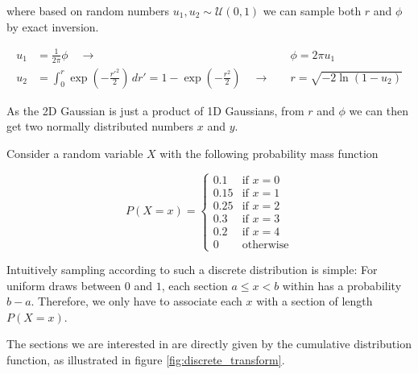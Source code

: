 where based on random numbers $u_1, u_2 \sim \mathcal{U}(0,1)$ we can sample both $r$ and $\phi$ by exact inversion.

\begin{equation}
    \begin{aligned}
        u_1 & = \frac{1}{2\pi} \phi \quad \rightarrow \quad &\phi = 2\pi u_1 \\
        u_2 & = \int_{0}^{r} \exp \left(-\frac{r'^2}{2}\right) \, dr'= 1 - \exp \left(-\frac{r^2}{2}\right) \quad \rightarrow \quad & r = \sqrt{-2 \ln(1 - u_2)}
    \end{aligned}
\end{equation}

As the 2D Gaussian is just a product of 1D Gaussians, from $r$ and $\phi$ we can then get two normally distributed numbers $x$ and $y$.



Consider a random variable $X$ with the following probability mass function

\begin{equation}
    P(X = x) = \begin{cases}
        0.1 & \text{if } x = 0 \\
        0.15 & \text{if } x = 1 \\
        0.25 & \text{if } x = 2 \\
        0.3 & \text{if } x = 3 \\
        0.2 & \text{if } x = 4 \\
        0 & \text{otherwise}
    \end{cases}
    \label{eq:discrete}
\end{equation}

Intuitively sampling according to such a discrete distribution is simple: 
For uniform draws between $0$ and $1$, each section $a \le x < b$ within has a probability $b - a$.
Therefore, we only have to associate each $x$ with a section of length $P(X = x)$.

The sections we are interested in are directly given by the cumulative distribution function, as illustrated in
figure \ref{fig:discrete_transform}.

